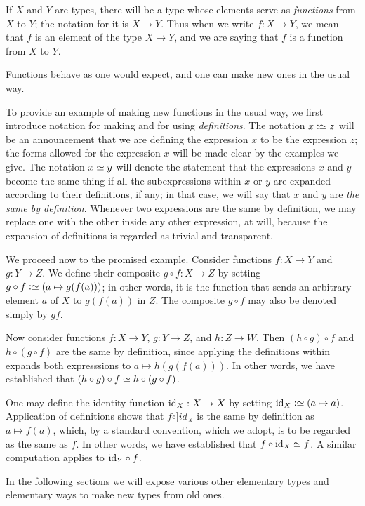 If $X$ and $Y$ are types, there will be a type whose elements serve as 
\emph{functions} from $X$ to $Y$; the notation for it is $X \to Y$.  
Thus when we write $f : X \to Y$, we mean that $f$ is an element of the type $X \to Y$, 
and we are saying that $f$ is a function from $X$ to $Y$.

Functions behave as one would expect, and one can make new ones in the usual way.

To provide an example of making new functions in the usual way, we first introduce notation for making and for using {\em definitions}.  The
notation $x \defeq z$ will be an announcement that we are defining the expression $x$ to be the expression $z$; the forms allowed for the
expression $x$ will be made clear by the examples we give.  The notation $x \jdeq y$ will denote the statement that the expressions $x$ and $y$
become the same thing if all the subexpressions within $x$ or $y$ are expanded according to their definitions, if any; in that case, we will say
that $x$ and $y$ are \emph{the same by definition}.  Whenever two expressions are the same by definition, we may replace one with the other
inside any other expression, at will, because the expansion of definitions is regarded as trivial and transparent.

We proceed now to the promised example.  Consider functions $f : X \to Y$ and $g : Y \to Z$.  We define their composite $g \circ f : X \to Z$ by
setting $g \circ f \defeq (a \mapsto g(f(a)))$; in other words, it is the function that sends an arbitrary element $a$ of $X$ to $g(f(a))$ in
$Z$.  The composite $g \circ f$ may also be denoted simply by $gf$.

Now consider functions $f : X \to Y$, $g : Y \to Z$, and $h : Z \to W$.  Then $(h \circ g) \circ f$ and $h \circ (g \circ f)$ are the same by
definition, since applying the definitions within expands both expresssions to $a \mapsto h(g(f(a)))$.  In other
words, we have established that $(h \circ g) \circ f \jdeq h \circ (g \circ f)$.

One may define the identity function $\mathord{\mathrm{id}}_X : X \to X$ by setting $\id_X \defeq (a \mapsto a)$.  Application of definitions shows that $f \circ
]id_X$ is the same by definition as $a \mapsto f(a)$, which, by a standard convention, which we adopt, is to be regarded as the same as $f$.  In
other words, we have established that $f \circ \id_X \jdeq f$.  A similar computation applies to $\mathord{\mathrm{id}}_Y \circ f$.

In the following sections we will expose various other elementary types and elementary ways to make new types from old ones.

